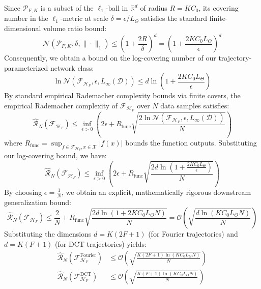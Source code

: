Since $\mathcal{P}_{F, K}$ is a subset of the $\ell_1$-ball in $\mathbb{R}^d$ of radius $R = K C_0$, its covering number in the $\ell_1$-metric at scale $\delta = \epsilon / L_{\Theta}$ satisfies the standard finite-dimensional volume ratio bound:
\begin{equation}
    \mathcal{N}(\mathcal{P}_{F, K}, \delta, \|\cdot\|_1) \le \left( 1 + \frac{2 R}{\delta} \right)^d = \left( 1 + \frac{2 K C_0 L_{\Theta}}{\epsilon} \right)^d
\end{equation}
Consequently, we obtain a bound on the log-covering number of our trajectory-parameterized network class:
\begin{equation}
    \ln \mathcal{N}(\mathcal{F}_{\mathcal{H}_F}, \epsilon, L_\infty(\mathcal{D})) \le d \ln\left( 1 + \frac{2 K C_0 L_{\Theta}}{\epsilon} \right)
\end{equation}
By standard empirical Rademacher complexity bounds via finite covers, the empirical Rademacher complexity of $\mathcal{F}_{\mathcal{H}_F}$ over $N$ data samples satisfies:
\begin{equation}
    \widehat{\mathcal{R}}_N(\mathcal{F}_{\mathcal{H}_F}) \le \inf_{\epsilon > 0} \left( 2 \epsilon + R_{\text{func}} \sqrt{\frac{2 \ln \mathcal{N}(\mathcal{F}_{\mathcal{H}_F}, \epsilon, L_\infty(\mathcal{D}))}{N}} \right)
\end{equation}
where $R_{\text{func}} = \sup_{f \in \mathcal{F}_{\mathcal{H}_F}, x \in \mathcal{X}} |f(x)|$ bounds the function outputs. Substituting our log-covering bound, we have:
\begin{equation}
    \widehat{\mathcal{R}}_N(\mathcal{F}_{\mathcal{H}_F}) \le \inf_{\epsilon > 0} \left( 2 \epsilon + R_{\text{func}} \sqrt{\frac{2 d \ln\left(1 + \frac{2 K C_0 L_{\Theta}}{\epsilon}\right)}{N}} \right)
\end{equation}
By choosing $\epsilon = \frac{1}{N}$, we obtain an explicit, mathematically rigorous downstream generalization bound:
\begin{equation}
    \widehat{\mathcal{R}}_N(\mathcal{F}_{\mathcal{H}_F}) \le \frac{2}{N} + R_{\text{func}} \sqrt{\frac{2 d \ln(1 + 2 K C_0 L_{\Theta} N)}{N}} = \mathcal{O}\left( \sqrt{\frac{d \ln(K C_0 L_{\Theta} N)}{N}} \right)
\end{equation}
Substituting the dimensions $d = K(2F+1)$ (for Fourier trajectories) and $d = K(F+1)$ (for DCT trajectories) yields:
\begin{align}
    \widehat{\mathcal{R}}_N(\mathcal{F}_{\mathcal{H}_F}^{\text{Fourier}}) &\le \mathcal{O}\left( \sqrt{\frac{K(2F+1) \ln(K C_0 L_{\Theta} N)}{N}} \right) \\
    \widehat{\mathcal{R}}_N(\mathcal{F}_{\mathcal{H}_F}^{\text{DCT}}) &\le \mathcal{O}\left( \sqrt{\frac{K(F+1) \ln(K C_0 L_{\Theta} N)}{N}} \right)
\end{align}

